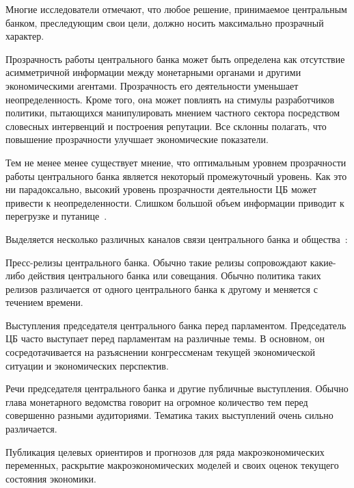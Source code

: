 \documentclass[14pt,a4paper, oneside]{extreport}
\newcounter{notes}
\renewenvironment{enumerate}%
{\begin{list}{\arabic{notes})} {\usecounter{notes}%
\setlength{\parsep}{0em}%
\setlength{\itemsep}{0em}%
\setlength{\topsep}{0.75ex}%
\setlength{\parskip}{0em}
}}%
{\end{list}}
\theoremstyle{plain}              %
\theoremstyle{definition}         %
\begin{document}
Многие исследователи отмечают, что любое решение, принимаемое центральным банком, преследующим свои цели, должно носить максимально прозрачный характер.

Прозрачность работы центрального банка может быть определена как отсутствие асимметричной информации между монетарными органами и другими экономическими агентами.  Прозрачность его деятельности уменьшает неопределенность. Кроме того, она может повлиять на стимулы разработчиков политики, пытающихся манипулировать мнением частного сектора посредством словесных интервенций и построения репутации.  Все склонны полагать, что повышение прозрачности улучшает экономические показатели.

Тем не менее менее существует мнение, что оптимальным уровнем прозрачности работы центрального банка является некоторый промежуточный уровень. Как это ни парадоксально, высокий уровень прозрачности деятельности ЦБ может привести к неопределенности.  Слишком большой объем информации приводит к перегрузке и путанице~\cite{morris2005central}.

Выделяется несколько различных каналов связи центрального банка и общества~\cite{kohn2003central}:

\begin{enumerate}
\item Пресс-релизы центрального банка. Обычно такие релизы сопровождают какие-либо действия центрального банка или совещания.  Обычно политика таких релизов различается от одного центрального банка к другому и меняется с течением времени.

\item Выступления председателя центрального банка перед парламентом. Председатель ЦБ часто выступает перед парламентам на различные темы. В основном, он сосредотачивается на разъяснении конгрессменам текущей экономической ситуации и экономических перспектив.


\item Речи председателя центрального банка и другие публичные выступления. Обычно глава монетарного ведомства говорит на огромное количество тем перед совершенно разными аудиториями. Тематика таких выступлений очень сильно различается. 

\item Публикация целевых ориентиров и прогнозов для ряда макроэкономических переменных, раскрытие макроэкономических моделей и своих оценок текущего состояния экономики.
\end{enumerate}
\end{document}
